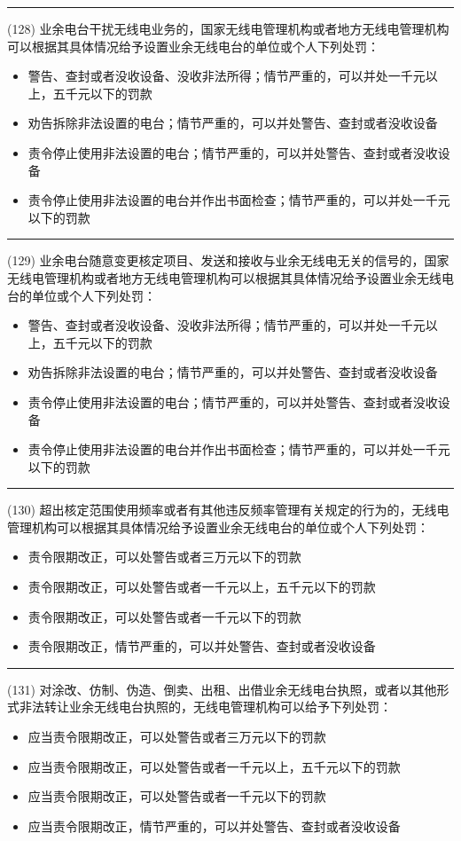 \documentclass[twocolumn,hyperref,UTF8]{ctexart}  %
\begin{document}
\noindent\rule{0.5\textwidth}{1pt}
\heiti (128) 业余电台干扰无线电业务的，国家无线电管理机构或者地方无线电管理机构可以根据其具体情况给予设置业余无线电台的单位或个人下列处罚： \songti {\color{gray} [LK0095] }
\begin{itemize}
	\item  警告、查封或者没收设备、没收非法所得；情节严重的，可以并处一千元以上，五千元以下的罚款
	\item  劝告拆除非法设置的电台；情节严重的，可以并处警告、查封或者没收设备
	\item  责令停止使用非法设置的电台；情节严重的，可以并处警告、查封或者没收设备
	\item  责令停止使用非法设置的电台并作出书面检查；情节严重的，可以并处一千元以下的罚款
\end{itemize}


\noindent\rule{0.5\textwidth}{1pt}
\heiti (129) 业余电台随意变更核定项目、发送和接收与业余无线电无关的信号的，国家无线电管理机构或者地方无线电管理机构可以根据其具体情况给予设置业余无线电台的单位或个人下列处罚： \songti {\color{gray} [LK0096] }
\begin{itemize}
	\item  警告、查封或者没收设备、没收非法所得；情节严重的，可以并处一千元以上，五千元以下的罚款
	\item  劝告拆除非法设置的电台；情节严重的，可以并处警告、查封或者没收设备
	\item  责令停止使用非法设置的电台；情节严重的，可以并处警告、查封或者没收设备
	\item  责令停止使用非法设置的电台并作出书面检查；情节严重的，可以并处一千元以下的罚款
\end{itemize}


\noindent\rule{0.5\textwidth}{1pt}
\heiti (130) 超出核定范围使用频率或者有其他违反频率管理有关规定的行为的，无线电管理机构可以根据其具体情况给予设置业余无线电台的单位或个人下列处罚： \songti {\color{gray} [LK0097] }
\begin{itemize}
	\item  责令限期改正，可以处警告或者三万元以下的罚款
	\item  责令限期改正，可以处警告或者一千元以上，五千元以下的罚款
	\item  责令限期改正，可以处警告或者一千元以下的罚款
	\item  责令限期改正，情节严重的，可以并处警告、查封或者没收设备
\end{itemize}


\noindent\rule{0.5\textwidth}{1pt}
\heiti (131) 对涂改、仿制、伪造、倒卖、出租、出借业余无线电台执照，或者以其他形式非法转让业余无线电台执照的，无线电管理机构可以给予下列处罚： \songti {\color{gray} [LK0098] }
\begin{itemize}
	\item  应当责令限期改正，可以处警告或者三万元以下的罚款
	\item  应当责令限期改正，可以处警告或者一千元以上，五千元以下的罚款
	\item  应当责令限期改正，可以处警告或者一千元以下的罚款
	\item  应当责令限期改正，情节严重的，可以并处警告、查封或者没收设备
\end{itemize}
\end{document}
